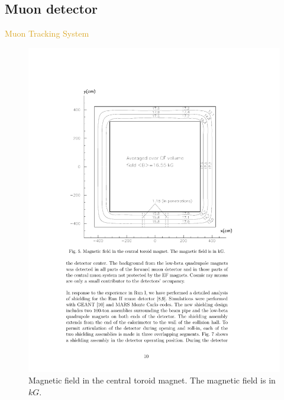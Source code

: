 \subsection*{Muon detector}
\begin{frame}{\textcolor{Goldenrod}{Muon Tracking System }}
  \begin{overlayarea}{\textwidth}{\textheight}
    \begin{figure}[h]
      \centering
      \includegraphics[height=0.7\textheight]{./Images/42_MD_central_magnet}
      \caption*{{\scriptsize Magnetic field in the central toroid
          magnet. The magnetic field is in $kG$.}}
    \end{figure}

  \end{overlayarea}
\end{frame}


